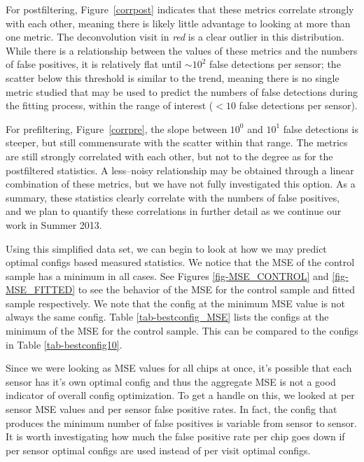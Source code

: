 \documentclass[prd, nofootinbib, floatfix, 11pt,tightenlines,times]{article}
\begin{document}
For postfiltering, Figure~\ref{corrpost} indicates that these metrics
correlate strongly with each other, meaning there is likely little
advantage to looking at more than one metric.  The deconvolution visit
in {\it red} is a clear outlier in this distribution.  While there is
a relationship between the values of these metrics and the numbers of
false positives, it is relatively flat until $\sim 10^2$ false
detections per sensor; the scatter below this threshold is similar to
the trend, meaning there is no single metric studied that may be used
to predict the numbers of false detections during the fitting process,
within the range of interest ($<10$ false detections per sensor).

For prefiltering, Figure~\ref{corrpre}, the slope between $10^0$ and
$10^1$ false detections is steeper, but still commensurate with the
scatter within that range.  The metrics are still strongly correlated
with each other, but not to the degree as for the postfiltered
statistics.  A less--noisy relationship may be obtained through a
linear combination of these metrics, but we have not fully
investigated this option.  As a summary, these statistics clearly
correlate with the numbers of false positives, and we plan to quantify
these correlations in further detail as we continue our work in Summer
2013.

Using this simplified data set, we can begin to look at how we may predict 
optimal configs based measured statistics.  We notice that the MSE of the
control sample has a minimum in all cases.  See Figures \ref{fig-MSE_CONTROL}
and \ref{fig-MSE_FITTED} to see the behavior of the MSE for the control sample and
fitted sample respectively.  We note that the config at the minimum MSE value is
not always the same config.  Table \ref{tab-bestconfig_MSE} lists the configs
at the minimum of the MSE for the control sample.  This can be compared to
the configs in Table \ref{tab-bestconfig10}.

Since we were looking as MSE values for all chips at once, it's possible that
each sensor has it's own optimal config and thus the aggregate MSE is not a 
good indicator of overall config optimization.  To get a handle on this, we
looked at per sensor MSE values and per sensor false positive rates.  In fact,
the config that produces the minimum number of false positives is variable
from sensor to sensor.  It is worth investigating how much the false positive rate
per chip goes down if per sensor optimal configs are used instead of per visit optimal
configs.
\end{document}
